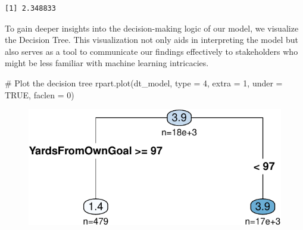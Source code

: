 \documentclass[
  super,
  preprint,
  3p]{elsarticle}
\newenvironment{Shaded}{\begin{snugshade}}{\end{snugshade}}
\newcommand{\AttributeTok}[1]{\textcolor[rgb]{0.40,0.45,0.13}{#1}}
\newcommand{\CommentTok}[1]{\textcolor[rgb]{0.37,0.37,0.37}{#1}}
\newcommand{\ConstantTok}[1]{\textcolor[rgb]{0.56,0.35,0.01}{#1}}
\newcommand{\DecValTok}[1]{\textcolor[rgb]{0.68,0.00,0.00}{#1}}
\newcommand{\FloatTok}[1]{\textcolor[rgb]{0.68,0.00,0.00}{#1}}
\newcommand{\FunctionTok}[1]{\textcolor[rgb]{0.28,0.35,0.67}{#1}}
\newcommand{\NormalTok}[1]{\textcolor[rgb]{0.00,0.23,0.31}{#1}}
\newcommand{\OtherTok}[1]{\textcolor[rgb]{0.00,0.23,0.31}{#1}}
\newcommand{\SpecialCharTok}[1]{\textcolor[rgb]{0.37,0.37,0.37}{#1}}
\newcommand{\StringTok}[1]{\textcolor[rgb]{0.13,0.47,0.30}{#1}}
\begin{document}
\begin{Shaded}
\end{Shaded}

\begin{verbatim}
[1] 2.348833
\end{verbatim}

To gain deeper insights into the decision-making logic of our model, we
visualize the Decision Tree. This visualization not only aids in
interpreting the model but also serves as a tool to communicate our
findings effectively to stakeholders who might be less familiar with
machine learning intricacies.

\begin{Shaded}
\begin{Highlighting}[]
\CommentTok{\# Plot the decision tree}
\FunctionTok{rpart.plot}\NormalTok{(dt\_model, }\AttributeTok{type =} \DecValTok{4}\NormalTok{, }\AttributeTok{extra =} \DecValTok{1}\NormalTok{, }\AttributeTok{under =} \ConstantTok{TRUE}\NormalTok{, }\AttributeTok{faclen =} \DecValTok{0}\NormalTok{)}
\end{Highlighting}
\end{Shaded}

\begin{figure}[H]

{\centering \includegraphics{project_report_files/figure-pdf/unnamed-chunk-6-1.pdf}

}

\end{figure}
\end{document}

